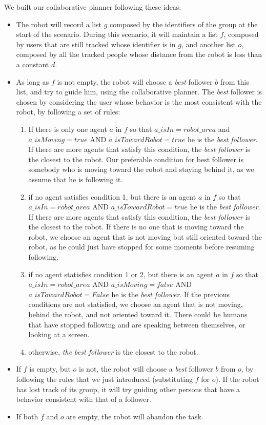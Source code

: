 
We built our collaborative planner following these ideas:
\begin{itemize}
\item The robot will record a list $g$ composed by the identifiers of the group at the start of the scenario. During this scenario, it will maintain a list $f$, composed by users that are still tracked whose identifier is in $g$, and another list $o$, composed by all the tracked people whose distance from the robot is less than a constant $d$. 
\item As long as $f$ is not empty, the robot will choose a \textit{best} follower $b$ from this list, and try to guide him, using the collaborative planner. The \textit{best} follower is chosen by considering the user whose behavior is the most consistent with the robot, by following a set of rules:
	\begin{enumerate}
		\item If there is only one agent $a$ in $f$ so that $a\_isIn=robot\_area$ and $a\_isMoving=true$ AND $a\_isTowardRobot=true$ he is the \textit{best follower}. If there are more agents that satisfy this condition, the \textit{best follower} is the closest to the robot. Our preferable condition for best follower is somebody who is moving toward the robot and staying behind it, as we assume that he is following it.
		\item if no agent satisfies condition 1, but there is an agent $a$ in $f$ so that $a\_isIn=robot\_area$ AND $a\_isTowardRobot=true$ he is the \textit{best follower}. If there are more agents that satisfy this condition, the \textit{best follower} is the closest to the robot. If there is no one that is moving toward the robot, we choose an agent that is not moving but still oriented toward the robot, as he could just have stopped for some moments before resuming following.
		\item if no agent statisfies condition 1 or 2, but there is an agent $a$ in $f$ so that $a\_isIn=robot\_area$ AND $a\_isMoving=false$ AND $a\_isTowardRobot=False$ he is the \textit{best follower}. If the previous conditions are not statisfied, we choose an agent that is not moving, behind the robot, and not oriented toward it. There could be humans that have stopped following and are speaking between themselves, or looking at a screen.
		\item otherwise, \textit{the best follower} is the closest to the robot.
	\end{enumerate}
\item If $f$ is empty, but $o$ is not, the robot will choose a \textit{best} follower $b$ from $o$, by following the rules that we just introduced (substituting $f$ for $o$). If the robot has lost track of its group, it will try guiding other persons that have a behavior consistent with that of a follower.
\item If  both $f$ and $o$ are empty, the robot will abandon the task.
\end{itemize}


